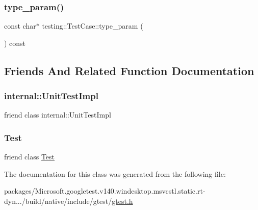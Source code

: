 \subsubsection{\texorpdfstring{type\_param()}{type\_param()}}
{\footnotesize\ttfamily const char$\ast$ testing\+::\+Test\+Case\+::type\+\_\+param (\begin{DoxyParamCaption}{ }\end{DoxyParamCaption}) const\hspace{0.3cm}{\ttfamily [inline]}}



\subsection{Friends And Related Function Documentation}
\mbox{\label{classtesting_1_1_test_case_acc0a5e7573fd6ae7ad1878613bb86853}} 
\subsubsection{\texorpdfstring{internal::UnitTestImpl}{internal::UnitTestImpl}}
{\footnotesize\ttfamily friend class internal\+::\+Unit\+Test\+Impl\hspace{0.3cm}{\ttfamily [friend]}}

\mbox{\label{classtesting_1_1_test_case_a5b78b1c2e1fa07ffed92da365593eaa4}} 
\subsubsection{\texorpdfstring{Test}{Test}}
{\footnotesize\ttfamily friend class \mbox{\hyperlink{classtesting_1_1_test}{Test}}\hspace{0.3cm}{\ttfamily [friend]}}



The documentation for this class was generated from the following file\+:\begin{DoxyCompactItemize}
\item 
packages/\+Microsoft.\+googletest.\+v140.\+windesktop.\+msvcstl.\+static.\+rt-\/dyn.../build/native/include/gtest/\mbox{\hyperlink{gtest_8h}{gtest.\+h}}\end{DoxyCompactItemize}
